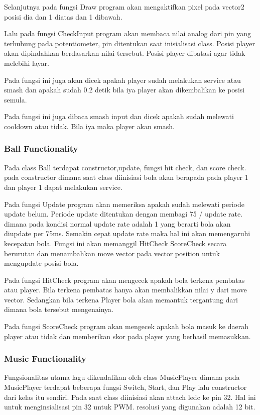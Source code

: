 \documentclass[a4paper,12pt]{article}
\begin{document}
Selanjutnya pada fungsi Draw program akan mengaktifkan pixel pada vector2 posisi dia dan 1 diatas dan 1 dibawah.

Lalu pada fungsi CheckInput program akan membaca nilai analog dari pin yang terhubung pada potentiometer, pin
ditentukan saat inisialisasi class. Posisi player akan dipindahkan berdasarkan nilai tersebut. Posisi player dibatasi
agar tidak melebihi layar.

Pada fungsi ini juga akan dicek apakah player sudah melakukan service atau smash dan apakah sudah 0.2 detik
bila iya player akan dikembalikan ke posisi semula.

Pada fungsi ini juga dibaca smash input dan dicek apakah sudah melewati cooldown atau tidak. Bila iya maka player akan smash.


\subsubsection{Ball Functionality}
Pada class Ball terdapat constructor,update, fungsi hit check, dan score check.
pada constructor dimana saat class diinisiasi bola akan berapada pada player 1 dan player 1 dapat melakukan service.

Pada fungsi Update program akan memeriksa apakah sudah melewati periode update belum. Periode update ditentukan dengan membagi 75 / update rate.
dimana pada kondisi normal update rate adalah 1 yang berarti bola akan diupdate per 75ms. Semakin cepat update rate maka hal ini akan memengaruhi
kecepatan bola. Fungsi ini akan memanggil HitCheck ScoreCheck secara berurutan dan menambahkan move vector pada vector position untuk
mengupdate posisi bola.

Pada fungsi HitCheck program akan mengecek apakah bola terkena pembatas atau player. Bila terkena pembatas hanya akan membalikkan nilai y dari move vector.
Sedangkan bila terkena Player bola akan memantuk tergantung dari dimana bola tersebut mengenainya.

Pada fungsi ScoreCheck program akan mengecek apakah bola masuk ke daerah player atau tidak dan memberikan skor pada player yang berhasil memasukkan.


\subsubsection{Music Functionality}
Fungsionalitas utama lagu dikendalikan oleh class MusicPlayer dimana pada MusicPlayer terdapat beberapa
fungsi Switch, Start, dan Play lalu constructor dari kelas itu sendiri. Pada saat class diinisiasi akan attach ledc ke pin 32. Hal ini
untuk menginsialisasi pin 32 untuk PWM. resolusi yang digunakan adalah 12 bit.
\end{document}
